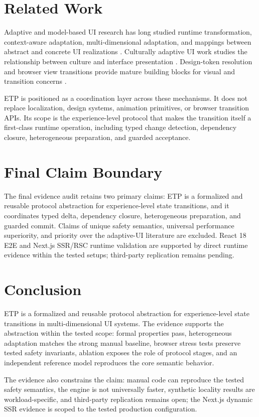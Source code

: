 \documentclass[manuscript]{acmart}
\begin{document}
\section{Related Work}
Adaptive and model-based UI research has long studied runtime transformation, context-aware
adaptation, multi-dimensional adaptation, and mappings between abstract and concrete UI
realizations \cite{nilsson2006,calvary2003}. Culturally adaptive UI work studies the
relationship between culture and interface presentation \cite{reinecke2011}. Design-token resolution and browser view transitions provide mature
building blocks for visual and transition concerns \cite{dtcgresolver,w3cvt}.

ETP is positioned as a coordination layer across these mechanisms. It does not replace
localization, design systems, animation primitives, or browser transition APIs. Its scope
is the experience-level protocol that makes the transition itself a first-class runtime
operation, including typed change detection, dependency closure, heterogeneous preparation,
and guarded acceptance.

\section{Final Claim Boundary}
The final evidence audit retains two primary claims: ETP is a formalized and reusable
protocol abstraction for experience-level state transitions, and it coordinates typed
delta, dependency closure, heterogeneous preparation, and guarded commit. Claims of
unique safety semantics, universal performance superiority, and priority over the
adaptive-UI literature are excluded. React 18 E2E and Next.js SSR/RSC runtime validation
are supported by direct runtime evidence within the tested setups; third-party replication
remains pending.

\section{Conclusion}
ETP is a formalized and reusable protocol abstraction for experience-level state transitions
in multi-dimensional UI systems. The evidence supports the abstraction within the tested
scope: formal properties pass, heterogeneous adaptation matches the strong manual baseline,
browser stress tests preserve tested safety invariants, ablation exposes the role of
protocol stages, and an independent reference model reproduces the core semantic behavior.

The evidence also constrains the claim: manual code can reproduce the tested safety semantics,
the engine is not universally faster, synthetic locality results are workload-specific, and
third-party replication remains open; the Next.js dynamic SSR evidence is scoped to the tested production configuration.
\end{document}
